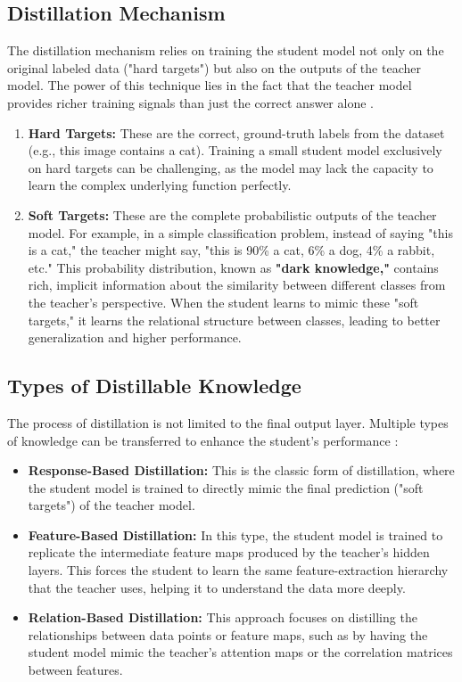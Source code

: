 \subsection{Distillation Mechanism}
\label{subsec:distillation_mechanism}

The distillation mechanism relies on training the student model not only on the original labeled data ("hard targets") but also on the outputs of the teacher model. The power of this technique lies in the fact that the teacher model provides richer training signals than just the correct answer alone \cite{hu2023teacher}.

\begin{enumerate}
    \item \textbf{Hard Targets:} These are the correct, ground-truth labels from the dataset (e.g., this image contains a cat). Training a small student model exclusively on hard targets can be challenging, as the model may lack the capacity to learn the complex underlying function perfectly.
    \item \textbf{Soft Targets:} These are the complete probabilistic outputs of the teacher model. For example, in a simple classification problem, instead of saying "this is a cat," the teacher might say, "this is 90\% a cat, 6\% a dog, 4\% a rabbit, etc." This probability distribution, known as \textbf{"dark knowledge,"} contains rich, implicit information about the similarity between different classes from the teacher's perspective. When the student learns to mimic these "soft targets," it learns the relational structure between classes, leading to better generalization and higher performance.
\end{enumerate}

\subsection{Types of Distillable Knowledge}
\label{subsec:types_of_knowledge}

The process of distillation is not limited to the final output layer. Multiple types of knowledge can be transferred to enhance the student's performance \cite{hu2023teacher}:
\begin{itemize}
    \item \textbf{Response-Based Distillation:} This is the classic form of distillation, where the student model is trained to directly mimic the final prediction ("soft targets") of the teacher model.
    \item \textbf{Feature-Based Distillation:} In this type, the student model is trained to replicate the intermediate feature maps produced by the teacher's hidden layers. This forces the student to learn the same feature-extraction hierarchy that the teacher uses, helping it to understand the data more deeply.
    \item \textbf{Relation-Based Distillation:} This approach focuses on distilling the relationships between data points or feature maps, such as by having the student model mimic the teacher's attention maps or the correlation matrices between features.
\end{itemize}

